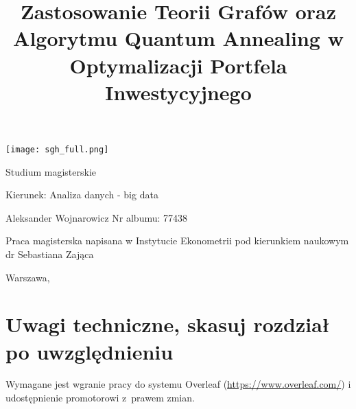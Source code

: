 \documentclass[12pt,a4paper,twoside,openany]{book}
\begin{document}
\begin{center}
\texttt{[image: sgh\_full.png]}

\vspace{1cm}

Studium magisterskie
\end{center}

\vspace{1cm}

\noindent Kierunek: Analiza danych - big data

\vspace{1cm}

{
\leftskip=10cm\noindent
Aleksander Wojnarowicz\newline
Nr albumu: 77438

}

\vspace{2cm}

\title{Zastosowanie Teorii Grafów oraz Algorytmu Quantum Annealing w Optymalizacji Portfela Inwestycyjnego}
\makeatletter

\begin{center}
\LARGE\bf
{\@title}
\end{center}

\vspace{2cm}

{
\leftskip=10cm\noindent
Praca magisterska
napisana w\newline
Instytucie Ekonometrii\newline
pod kierunkiem naukowym\newline
dr Sebastiana Zająca

}

\vfill

\begin{center}
Warszawa, \the\year
\end{center}
\thispagestyle{empty}

\clearpage
\thispagestyle{empty}
\mbox{}
\clearpage

\tableofcontents

\clearpage

\chapter*{Uwagi techniczne, skasuj rozdział po uwzględnieniu}

Wymagane jest wgranie pracy do systemu Overleaf (\url{https://www.overleaf.com/}) i udostępnienie promotorowi z~prawem zmian.
\end{document}
